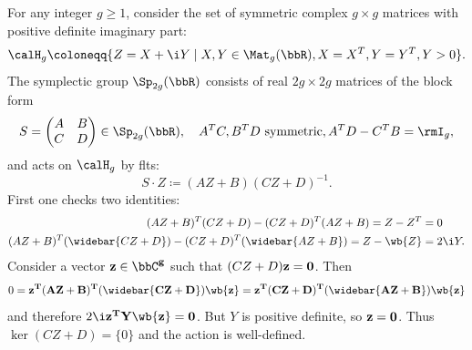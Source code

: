 \begin{example}\label{ex siegel upper half-space}
    For any integer $g\geq 1$, consider the set of symmetric complex $g\times g$ matrices with positive definite imaginary part:
    \[\calH_g \coloneqq \{Z=X+\i Y\mid X,Y\in \Mat_g(\bbR), X=X^T, Y=Y^T, Y>0\}.\]
    The symplectic group $\Sp_{2g}(\bbR)$ consists of real $2g\times 2g$ matrices of the block form 
    \[S=\begin{pmatrix}
        A & B\\
        C & D
    \end{pmatrix}\in\Sp_{2g}(\bbR),\quad A^T C,B^TD\text{ symmetric}, A^TD-C^TB=\rmI_g,\]
    and acts on $\calH_g$ by \glspl{flt}:
    \[S\cdot Z\coloneqq (AZ+B)(CZ+D)^{-1}.\]
    First one checks two identities:
    \begin{align}
        (AZ+B)^T (CZ+D)-(CZ+D)^T(AZ+B)=Z-Z^T&=0 \label{1y94}\\
        (AZ+B)^T (\widebar{CZ+D})-(CZ+D)^T(\widebar{AZ+B})=Z-\wb{Z}&=2\i Y.\label{13702}
    \end{align}
    Consider a vector $\bf{z}\in\bbC^g$ such that $(CZ+D)\bf{z}=0$. Then 
    \[0=\bf{z}^T (AZ+B)^T(\widebar{CZ+D})\wb{\bf{z}}=\bf{z}^T (CZ+D)^T(\widebar{AZ+B})\wb{\bf{z}}\]
    and therefore $2\i \bf{z}^T Y \wb{\bf{z}}=0$. But $Y$ is positive definite, so $\bf{z}=0$. Thus $\ker(CZ+D)=\{0\}$ and the action is well-defined.


\end{example}
